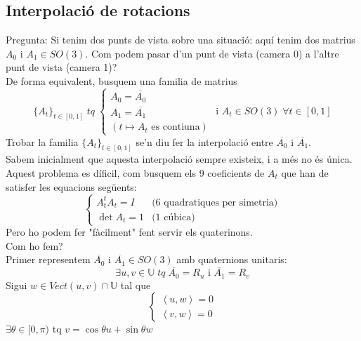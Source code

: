 \documentclass[../main.tex]{subfiles}
\begin{document}
	\subsection{Interpolació de rotacions}
	Pregunta: Si tenim dos punts de vista sobre una situació: aquí tenim dos matrius $A_0$ i $A_1 \in SO(3)$. Com podem pasar d'un punt de vista (camera 0) a l'altre punt de vista (camera 1)?\\
	De forma equivalent, busquem una familia de matrius
	\begin{displaymath}
		\{A_t\}_{t\in[0,1]}\;tq\;\begin{cases}
			A_0 = \overline{A_0}\\
			A_1 = \overline{A_1}\\
			(t \mapsto A_t \text{ es contiuna})
		\end{cases}
		\text{ i } A_t \in SO(3)\;\forall t \in [0,1]
	\end{displaymath}
	Trobar la familia $\{A_t\}_{t\in[0,1]}$ se'n diu fer la interpolació entre $\overline{A_0}$ i $\overline{A_1}$.\\
	Sabem inicialment que aquesta interpolació sempre existeix, i a més no és única.\\
	Aquest problema es díficil, com busquem els $9$ coeficients de $A_t$ que han de satisfer les equacions següents:
	\begin{displaymath}
		\begin{cases}
			A_t^tA_t = I &\text{(6 quadratiques per simetria)}\\
			\det{A_t} = 1 &\text{(1 cúbica)}
		\end{cases}
	\end{displaymath}
	Pero ho podem fer "fàcilment" fent servir els quaterinons.\\
	Com ho fem?\\
	Primer representem $\overline{A_0}$ i $\overline{A_1} \in SO(3)$ amb quaternions unitaris:
	\begin{displaymath}
		\exists u, v \in \mathbb{U}\;tq\;\overline{A_0} = R_u \text{ i } \overline{A_1} = R_v
	\end{displaymath}
	Sigui $w \in Vect(u, v) \cap \mathbb{U}$ tal que
	\begin{displaymath}
		\begin{cases}
			\left\langle u, w \right\rangle = 0\\
			\left\langle v, w \right\rangle = 0
		\end{cases}
	\end{displaymath}
	$\exists \theta \in [0, \pi)$ tq $v = \cos{\theta}u + \sin{\theta}w$\\
\end{document}
